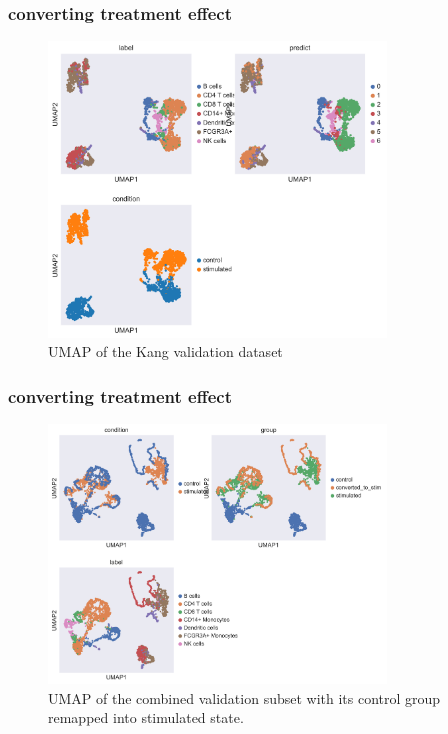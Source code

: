 \documentclass[final]{beamer}
\theoremstyle{plain}
\theoremstyle{definition}
\theoremstyle{remark}
\begin{document}
\begin{frame}
\frametitle{converting treatment effect}
\begin{figure}[h]
\centering
\includegraphics[width=0.8\textwidth]{images/Kang_super_val_umap.png}
\caption{UMAP of the Kang validation dataset
}
\label{fig:Kang_super_val_umap}
\end{figure}
\end{frame}

\begin{frame}
\frametitle{converting treatment effect}
\begin{figure}[h]
\centering
\includegraphics[width=0.8\textwidth]{images/Kang_super_val_umap_converted_control.png}
\caption{
UMAP of the combined validation subset with its control group remapped into
stimulated state.
}
\label{fig:Kang_super_val_umap_converted_control}
\end{figure}
\end{frame}
\end{document}
